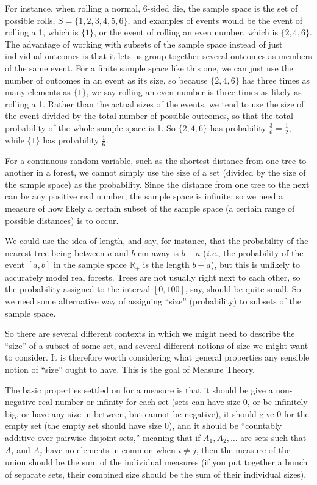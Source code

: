 \documentclass{article}
\begin{document}
For instance, when rolling a normal, 6-sided die, the sample space is the set of possible rolls, $S=\{1,2,3,4,5,6\}$, and examples of events would be the event of rolling a 1, which is $\{1\}$, or the event of rolling an even number, which is $\{2,4,6\}$. The advantage of working with subsets of the sample space instead of just individual outcomes is that it lets us group together several outcomes as members of the same event. For a finite sample space like this one, we can just use the number of outcomes in an event as its size, so because $\{2,4,6\}$ has three times as many elements as $\{1\}$, we say rolling an even number is three times as likely as rolling a 1. Rather than the actual sizes of the events, we tend to use the size of the event divided by the total number of possible outcomes, so that the total probability of the whole sample space is 1. So $\{2,4,6\}$ has probability $\frac{3}{6}=\frac{1}{2}$, while $\{1\}$ has probability $\frac{1}{6}$.

For a continuous random variable, such as the shortest distance from one tree to another in a forest, we cannot simply use the size of a set (divided by the size of the sample space) as the probability. Since the distance from one tree to the next can be any positive real number, the sample space is infinite; so we need a measure of how likely a certain subset of the sample space (a certain range of possible distances) is to occur.

We could use the idea of length, and say, for instance, that the probability of the nearest tree being between $a$ and $b$ cm away is $b-a$ (\textit{i.e.}, the probability of the event $[a,b]$ in the sample space $\mathbb{R}_+$ is the length $b-a$), but this is unlikely to accurately model real forests. Trees are not usually right next to each other, so the probability assigned to the interval $[0,100]$, say, should be quite small. So we need some alternative way of assigning ``size'' (probability) to subsets of the sample space.\bigskip


So there are several different contexts in which we might need to describe the ``size'' of a subset of some set, and several different notions of size we might want to consider. It is therefore worth considering what general properties any sensible notion of ``size'' ought to have. This is the goal of Measure Theory.

The basic properties settled on for a measure is that it should be give a non-negative real number or infinity for each set (sets can have size 0, or be infinitely big, or have any size in between, but cannot be negative), it should give 0 for the empty set (the empty set should have size 0), and it should be ``countably additive over pairwise disjoint sets,'' meaning that if $A_1,A_2,\hdots$ are sets such that $A_i$ and $A_j$ have no elements in common when $i\neq j$, then the measure of the union should be the sum of the individual measures (if you put together a bunch of separate sets, their combined size should be the sum of their individual sizes).
\end{document}

